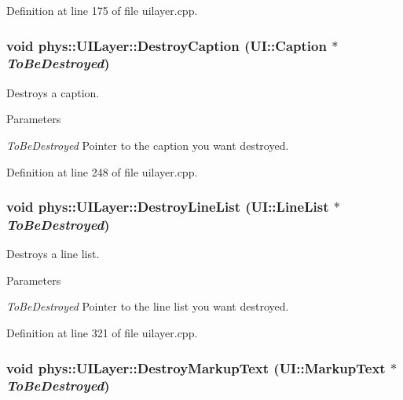 Definition at line 175 of file uilayer.cpp.

\hypertarget{classphys_1_1UILayer_a5c0ac9bd2b2c41178ccde42812e39210}{
\subsubsection[{DestroyCaption}]{\setlength{\rightskip}{0pt plus 5cm}void phys::UILayer::DestroyCaption ({\bf UI::Caption} $\ast$ {\em ToBeDestroyed})}}
\label{da/d48/classphys_1_1UILayer_a5c0ac9bd2b2c41178ccde42812e39210}


Destroys a caption. 


\begin{DoxyParams}{Parameters}
\item[{\em ToBeDestroyed}]Pointer to the caption you want destroyed. \end{DoxyParams}


Definition at line 248 of file uilayer.cpp.

\hypertarget{classphys_1_1UILayer_a8a8cbbfbf37c9d54c12de4c235f52ac2}{
\subsubsection[{DestroyLineList}]{\setlength{\rightskip}{0pt plus 5cm}void phys::UILayer::DestroyLineList ({\bf UI::LineList} $\ast$ {\em ToBeDestroyed})}}
\label{da/d48/classphys_1_1UILayer_a8a8cbbfbf37c9d54c12de4c235f52ac2}


Destroys a line list. 


\begin{DoxyParams}{Parameters}
\item[{\em ToBeDestroyed}]Pointer to the line list you want destroyed. \end{DoxyParams}


Definition at line 321 of file uilayer.cpp.

\hypertarget{classphys_1_1UILayer_a75d488037b5bcc97e88249de10ba1d64}{
\subsubsection[{DestroyMarkupText}]{\setlength{\rightskip}{0pt plus 5cm}void phys::UILayer::DestroyMarkupText ({\bf UI::MarkupText} $\ast$ {\em ToBeDestroyed})}}
\label{da/d48/classphys_1_1UILayer_a75d488037b5bcc97e88249de10ba1d64}



